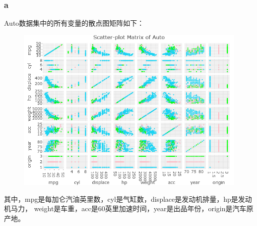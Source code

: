 \documentclass[12pt,a4paper]{article}
\begin{document}
    \title{}
    \date{}
    \author{姓名：\underline{刘哲}~~~~~~学号：\underline{2022103691}~~~~~~}
    \maketitle
    \section{}
    \vspace{10pt}
    \subsubsection*{a}
    Auto数据集中的所有变量的散点图矩阵如下：
    \begin{figure}[H]
        \centering
        \includegraphics[scale=0.65]{Splom.png}
    \end{figure}
    其中，mpg是每加仑汽油英里数，cyl是气缸数，displace是发动机排量，hp是发动机马力，
    weight是车重，acc是60英里加速时间，year是出品年份，origin是汽车原产地。
\end{document}
